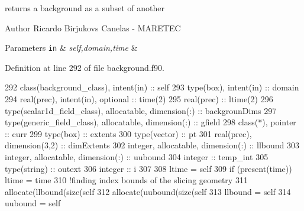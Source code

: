 returns a background as a subset of another 

\begin{DoxyAuthor}{Author}
Ricardo Birjukovs Canelas -\/ M\+A\+R\+E\+T\+EC 
\end{DoxyAuthor}

\begin{DoxyParams}[1]{Parameters}
\mbox{\tt in}  & {\em self,domain,time} & \\
\hline
\end{DoxyParams}


Definition at line 292 of file background.\+f90.


\begin{DoxyCode}
292     \textcolor{keywordtype}{class}(background\_class), \textcolor{keywordtype}{intent(in)} :: self
293     \textcolor{keywordtype}{type}(box), \textcolor{keywordtype}{intent(in)} :: domain
294     \textcolor{keywordtype}{real(prec)}, \textcolor{keywordtype}{intent(in)}, \textcolor{keywordtype}{optional} :: time(2)
295     \textcolor{keywordtype}{real(prec)} :: ltime(2)
296     \textcolor{keywordtype}{type}(scalar1d\_field\_class), \textcolor{keywordtype}{allocatable}, \textcolor{keywordtype}{dimension(:)} :: backgrounDims
297     \textcolor{keywordtype}{type}(generic\_field\_class), \textcolor{keywordtype}{allocatable}, \textcolor{keywordtype}{dimension(:)} :: gfield
298     \textcolor{keywordtype}{class}(*), \textcolor{keywordtype}{pointer} :: curr
299     \textcolor{keywordtype}{type}(box) :: extents
300     \textcolor{keywordtype}{type}(vector) :: pt
301     \textcolor{keywordtype}{real(prec)}, \textcolor{keywordtype}{dimension(3,2)} :: dimExtents
302     \textcolor{keywordtype}{integer}, \textcolor{keywordtype}{allocatable}, \textcolor{keywordtype}{dimension(:)} :: llbound
303     \textcolor{keywordtype}{integer}, \textcolor{keywordtype}{allocatable}, \textcolor{keywordtype}{dimension(:)} :: uubound
304     \textcolor{keywordtype}{integer} :: temp\_int
305     \textcolor{keywordtype}{type}(string) :: outext
306     \textcolor{keywordtype}{integer} :: i
307 
308     ltime = self%
309     \textcolor{keywordflow}{if} (\textcolor{keyword}{present}(time)) ltime = time
310     \textcolor{comment}{!finding index bounds of the slicing geometry}
311     \textcolor{keyword}{allocate}(llbound(\textcolor{keyword}{size}(self%
312     \textcolor{keyword}{allocate}(uubound(\textcolor{keyword}{size}(self%
313     llbound = self%
314     uubound = self%

\end{DoxyCode}
